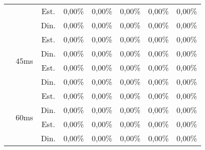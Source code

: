 \begin{center}
\begin{longtable}{|c|c|c|ccccc|}
 &  & Est. & 0,00\% & 0,00\% & 0,00\% & 0,00\% & 0,00\% \\
 &  & Din. & 0,00\% & 0,00\% & 0,00\% & 0,00\% & 0,00\% \\ \cline{2-8} 
 & \multirow{4}{*}{45ms} & Est. & 0,00\% & 0,00\% & 0,00\% & 0,00\% & 0,00\% \\
 &  & Din. & 0,00\% & 0,00\% & 0,00\% & 0,00\% & 0,00\% \\
 &  & Est. & 0,00\% & 0,00\% & 0,00\% & 0,00\% & 0,00\% \\
 &  & Din. & 0,00\% & 0,00\% & 0,00\% & 0,00\% & 0,00\% \\ \cline{2-8} 
 & \multirow{4}{*}{60ms} & Est. & 0,00\% & 0,00\% & 0,00\% & 0,00\% & 0,00\% \\
 &  & Din. & 0,00\% & 0,00\% & 0,00\% & 0,00\% & 0,00\% \\
 &  & Est. & 0,00\% & 0,00\% & 0,00\% & 0,00\% & 0,00\% \\
 &  & Din. & 0,00\% & 0,00\% & 0,00\% & 0,00\% & 0,00\% \\ \hline
\end{longtable}
\end{center}
